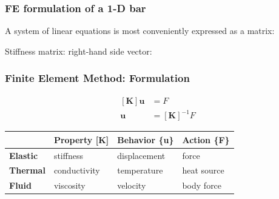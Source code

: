 \documentclass[notes]{beamer}
\begin{document}
\begin{frame}
\frametitle{FE formulation of a 1-D bar}
A system of linear equations is most conveniently expressed as a matrix:

Stiffness matrix: 
right-hand side vector:
\end{frame}


\begin{frame}
\frametitle{Finite Element Method: Formulation}
	\begin{align*}
		\left[\mathbf{K}\right]{\textbf{u}} & = {F} \\
		{\textbf{u}} & = \left[\mathbf{K}\right]^{-1} {F}
	\end{align*}
	
\begin{table}[]
	\begin{tabular}{llll}
		\toprule
		& \multicolumn{1}{l}{\textbf{Property {[}K{]}}} & \multicolumn{1}{l}{\textbf{Behavior \{u\}}} & \multicolumn{1}{l}{\textbf{Action \{F\}}} \\
		\midrule
		\textbf{Elastic} & stiffness                                     & displacement                                 & force                                     \\
		\textbf{Thermal} & conductivity                                  & temperature                                  & heat source                               \\
		\textbf{Fluid}   & viscosity                                     & velocity                                     & body force       						 \\
		\bottomrule                        
	\end{tabular}
\end{table}
\end{frame}
\end{document}
